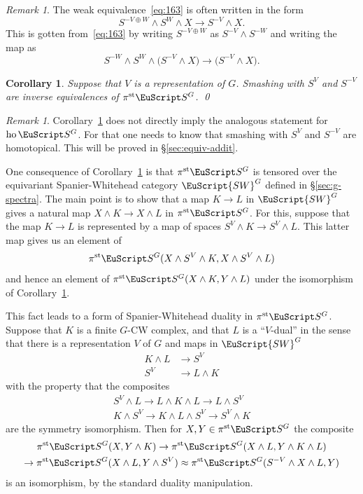 \documentclass{amsart}
\newtheorem{cor}[equation]{Corollary}
\newtheorem{rem}[equation]{Remark}
\theoremstyle{definition}
\theoremstyle{remark}
\newtheorem{rem}[equation]{Remark}
\newcommand{\spectra}{\EuScript S}
\newcommand{\swg}[1]{\EuScript {SW}^{#1}}
\DeclareMathOperator{\ho}{ho}
\newcommand{\ugspectra}[1]{\spectra^{#1}}
\newcommand{\pist}{\pi^{\text{st}}}
\begin{document}
\begin{rem}
\label{rem:63}
The weak equivalence~\eqref{eq:163} is often written in the
form 
\[
S^{-V\oplus W}\wedge S^{W}\wedge X\to S^{-V}\wedge X.
\]
This is gotten from~\eqref{eq:163} by writing $S^{-V\oplus W}$
as $S^{-V}\wedge S^{-W}$ and writing the map as
\[
S^{-W}\wedge S^{W}\wedge \big(S^{-V}\wedge X\big) \to 
\big(S^{-V}\wedge X\big).
\]
\end{rem}

\begin{cor}
\label{thm:130}
Suppose that $V$ is a representation of $G$.   Smashing with $S^{V}$
and $S^{-V}$ are inverse equivalences of $\pist\ugspectra{G}$. \qed
\end{cor}

\begin{rem}
\label{rem:26} Corollary~\ref{thm:130} does not directly imply the
analogous statement for $\ho\ugspectra{G}$.  For that one needs to
know that smashing with $S^{V}$ and $S^{-V}$ are homotopical.  This
will be proved in \S\ref{sec:equiv-addit}.
\end{rem}

One consequence of Corollary~\ref{thm:130} is that
$\pist\ugspectra{G}$ is tensored over the equivariant
Spanier-Whitehead category $\swg{G}$ defined in
\S\ref{sec:g-spectra}.  The main point is to show that a map $K\to L$
in $\swg{G}$ gives a natural map $X\wedge K\to X\wedge L$ in
$\pist\ugspectra{G}$.  For this, suppose that the map $K\to L$ is
represented by a map of spaces $S^{V}\wedge K\to S^{V}\wedge L$.  This
latter map gives us an element of 
\[
\pist\ugspectra{G}(X\wedge
S^{V}\wedge K, X\wedge S^{V}\wedge L)
\]
and hence an element of
$\pist\ugspectra{G}(X\wedge K,Y\wedge L)$ under the isomorphism of
Corollary~\ref{thm:130}.

This fact leads to a form of Spanier-Whitehead duality in
$\pist\ugspectra{G}$.  Suppose that $K$ is a finite $G$-CW complex,
and that $L$ is a ``$V$-dual'' in the sense that there is a
representation $V$ of $G$ and maps in $\swg{G}$
\begin{align*}
K\wedge L&\to S^{V} \\
S^{V} &\to L\wedge K
\end{align*}
with the property that the composites
\begin{gather*}
S^{V}\wedge L\to L\wedge K\wedge L \to L\wedge S^{V} \\
K\wedge S^{V}\to K\wedge L\wedge S^{V}\to S^{V}\wedge K
\end{gather*}
are the symmetry isomorphism.   Then for $X, Y\in\pist\ugspectra{G}$
the composite
\begin{multline}
\label{eq:164}
\pist\ugspectra{G}(X,Y\wedge K) \to 
\pist\ugspectra{G}(X\wedge L,Y\wedge K\wedge L) \\ \to 
\pist\ugspectra{G}(X\wedge L, Y\wedge S^{V})	  \approx
\pist\ugspectra{G}(S^{-V}\wedge X\wedge L, Y)
\end{multline}
is an isomorphism, by the standard duality manipulation.   
\end{document}
